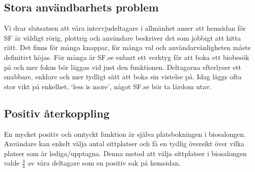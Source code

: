 \documentclass[swedish,a4paper,11pt]{article}
\begin{document}
\subsection{Stora användbarhets problem} 
Vi drar slutsatsen att våra intervjudeltagare i allmänhet anser att hemsidan för SF är väldigt rörig, plottrig och användare beskriver det som jobbigt att hitta rätt. Det finns för många knappar, för många val och användarvänligheten måste definitivt höjas. För många är SF.se enbart ett verktyg för att boka ett biobesök på och mer fokus bör läggas vid just den funktionen. Deltagarna efterlyser ett snabbare, enklare och mer tydligt sätt att boka sin vistelse på. Idag läggs ofta stor vikt på enkelhet, ‘less is more’, något SF.se bör ta lärdom utav. 

\subsection{Positiv återkoppling}
En mycket positiv och omtyckt funktion är själva platsbokningen i biosalongen. Användare kan enkelt välja antal sittplatser och få en tydlig översikt över vilka platser som är lediga/upptagna. Denna metod att välja sittplatser i biosalongen valde $\frac{3}{4}$ av våra deltagare som en positiv sak på hemsidan.

\newpage
\end{document}
